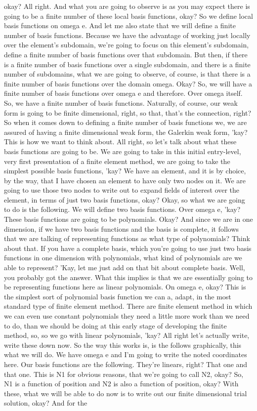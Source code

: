 \documentclass[10pt]{article}
\begin{document}
okay? All right. And what you are going to observe is as you may expect there is going to be a finite number of these local basis functions, okay? So we define local basis functions on omega e. And let me also state that we will define a finite number of basis functions.  Because we have the advantage of working just locally over the element's subdomain, we're going to focus on this element's subdomain, define a finite number of basis functions over that subdomain. But then, if there is a finite number of basis functions over a single subdomain, and there is a finite number of subdomains, what we are going to observe, of course, is that there is a finite number of basis functions over the domain omega. Okay? So, we will have a finite number of basis functions over omega e and therefore. Over omega itself. So, we have a finite number of basis functions. Naturally, of course, our weak form is going to be finite dimensional, right, so that, that's the connection, right? So when it comes down to defining a finite number of basis functions we, we are assured of having a finite dimensional weak form, the Galerkin weak form, 'kay? This is how we want to think about. All right, so let's talk about what these basis functions are going to be. We are going to take in this initial entry-level, very first presentation of a finite element method, we are going to take the simplest possible basis functions, 'kay? We have an element, and it is by choice, by the way, that I have chosen an element to have only two nodes on it. We are going to use those two nodes to write out to expand fields of interest over the element, in terms of just two basis functions, okay? Okay, so what we are going to do is the following. We will define two basis functions. Over omega e, 'kay? These basis functions are going to be polynomials. Okay? And since we are in one dimension, if we have two basis functions and the basis is complete, it follows that we are talking of representing functions as what type of polynomials? Think about that. If you have a complete basis, which you're going to use just two basis functions in one dimension with polynomials, what kind of polynomials are we able to represent? 'Kay, let me just add on that bit about complete basis. Well, you probably got the answer. What this implies is that we are essentially going to be representing functions here as linear polynomials. On omega e, okay? This is the simplest sort of polynomial basis function we can a, adapt, in the most standard type of finite element method. There are finite element method in which we can even use constant polynomials they need a little more work than we need to do, than we should be doing at this early stage of developing the finite method, so, so we go with linear polynomials, 'kay? All right let's actually write, write these down now. So the way this works is, is the follows graphically, this what we will do. We have omega e and I'm going to write the noted coordinates here. Our basis functions are the following. They're linears, right? That one and that one. This is N1 for obvious reasons, that we're going to call N2, okay? So, N1 is a function of position and N2 is also a function of position, okay? With these, what we will be able to do now is to write out our finite dimensional trial solution, okay? And for the 
\end{document}
